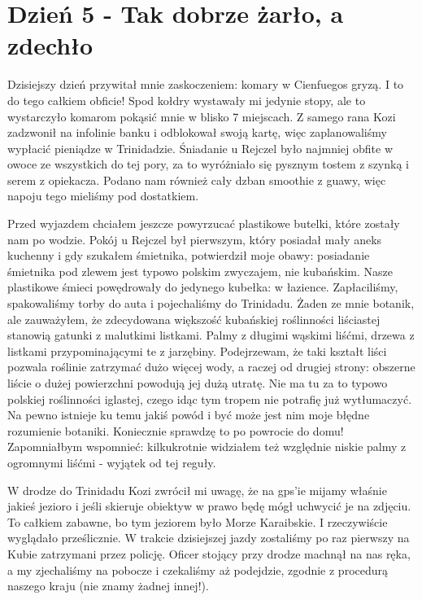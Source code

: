 
\chapter[Tak dobrze żarło, a zdechło]{Dzień 5 - Tak dobrze żarło, a zdechło}

Dzisiejszy dzień przywitał mnie zaskoczeniem: komary w Cienfuegos gryzą.
I to do tego całkiem obficie!
Spod kołdry wystawały mi jedynie stopy, ale to wystarczyło komarom pokąsić mnie w blisko 7 miejscach.
Z samego rana Kozi zadzwonił na infolinie banku i odblokował swoją kartę, więc zaplanowaliśmy wypłacić pieniądze w Trinidadzie.
Śniadanie u Rejczel było najmniej obfite w owoce ze wszystkich do tej pory, za to wyróżniało się pysznym tostem z szynką i serem z opiekacza.
Podano nam również cały dzban smoothie z guawy, więc napoju tego mieliśmy pod dostatkiem.
\par Przed wyjazdem chciałem jeszcze powyrzucać plastikowe butelki, które zostały nam po wodzie.
Pokój u Rejczel był pierwszym, który posiadał mały aneks kuchenny i gdy szukałem śmietnika, potwierdził moje obawy: posiadanie śmietnika pod zlewem jest typowo polskim zwyczajem, nie kubańskim.
Nasze plastikowe śmieci powędrowały do jedynego kubełka: w łazience.
Zapłaciliśmy, spakowaliśmy torby do auta i pojechaliśmy do Trinidadu.
Żaden ze mnie botanik, ale zauważyłem, że zdecydowana większość kubańskiej roślinności liściastej stanowią gatunki z malutkimi listkami.
Palmy z długimi wąskimi liśćmi, drzewa z listkami przypominającymi te z jarzębiny.
Podejrzewam, że taki kształt liści pozwala roślinie zatrzymać dużo więcej wody, a raczej od drugiej strony: obszerne liście o dużej powierzchni powodują jej dużą utratę.
Nie ma tu za to typowo polskiej roślinności iglastej, czego idąc tym tropem nie potrafię już wytłumaczyć.
Na pewno istnieje ku temu jakiś powód i być może jest nim moje błędne rozumienie botaniki.
Koniecznie sprawdzę to po powrocie do domu!
Zapomniałbym wspomnieć: kilkukrotnie widziałem też względnie niskie palmy z ogromnymi liśćmi - wyjątek od tej reguły.
\par W drodze do Trinidadu Kozi zwrócił mi uwagę, że na gps’ie mijamy właśnie jakieś jezioro i jeśli skieruje obiektyw w prawo będę mógł uchwycić je na zdjęciu.
To całkiem zabawne, bo tym jeziorem było Morze Karaibskie.
I rzeczywiście wyglądało prześlicznie.
W trakcie dzisiejszej jazdy zostaliśmy po raz pierwszy na Kubie zatrzymani przez policję.
Oficer stojący przy drodze machnął na nas ręka, a my zjechaliśmy na pobocze i czekaliśmy aż podejdzie, zgodnie z procedurą naszego kraju (nie znamy żadnej innej!).
